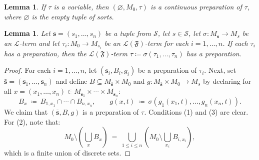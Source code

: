 \documentclass[11pt]{amsart}
\theoremstyle{plain}
\newtheorem{lemma}[thm]{Lemma}
\theoremstyle{definition}
\numberwithin{equation}{section}
\newcommand{\fr}{\mathfrak}
\newcommand\calL{\mathcal{L}}
\newcommand\calS{\mathcal{S}}
\newcommand\0{\varnothing}
\begin{document}
\begin{lemma}
If $\tau$ is a variable, then $(\0,M_0,\tau)$ is a continuous preparation of $\tau$, where $\0$ is the empty tuple of sorts.
\end{lemma}


\begin{lemma}
Let $\bm{s} = (s_1,\ldots,s_n)$ be a tuple from $\calS$, let $s \in \calS$, let $\sigma\colon M_{\bm{s}}\to M_s$ be an $\calL$-term and let $\tau_i\colon M_0\to M_{s_i}$ be an $\calL(\fr{F})$-term for each $i = 1,\ldots,n$. If each $\tau_i$ has a preparation, then the $\calL(\fr{F})$-term $\tau\coloneqq\sigma(\tau_1,\ldots,\tau_n)$ has a preparation.
\end{lemma}
\begin{proof}
For each $i=1,\ldots,n$, let $(\bm{s}_i,B_i,g_i)$ be a preparation of $\tau_i$. Next, set $\bar{\bm{s}} = (\bm{s}_1,\ldots,\bm{s}_n)$ and define $B\subseteq M_{\bar{\bm{s}}}\times M_0$ and $g\colon M_{\bar{\bm{s}}}\times M_0\to M_s$ by declaring for all $x=(x_1,\ldots,x_n)\in M_{\bm{s}_1}\times\cdots\times M_{\bm{s}_n}$:
\[
B_x \ \coloneqq  \ B_{1,x_1}\cap\cdots\cap B_{n,x_n},\qquad g(x,t) \ \coloneqq  \ \sigma(g_1(x_1,t),\ldots,g_n(x_n,t)).
\]
We claim that $(\bar{\bm{s}},B,g)$ is a preparation of $\tau$. Conditions (1) and (3) are clear. For (2), note that:
\[
\textstyle M_0\setminus (\bigcup_xB_x) \ =\  \bigcup_{1\leq i\leq n}(M_0\setminus \bigcup_{x_i}B_{i,x_i}),
\]
which is a finite union of discrete sets.
\end{proof}
\end{document}
